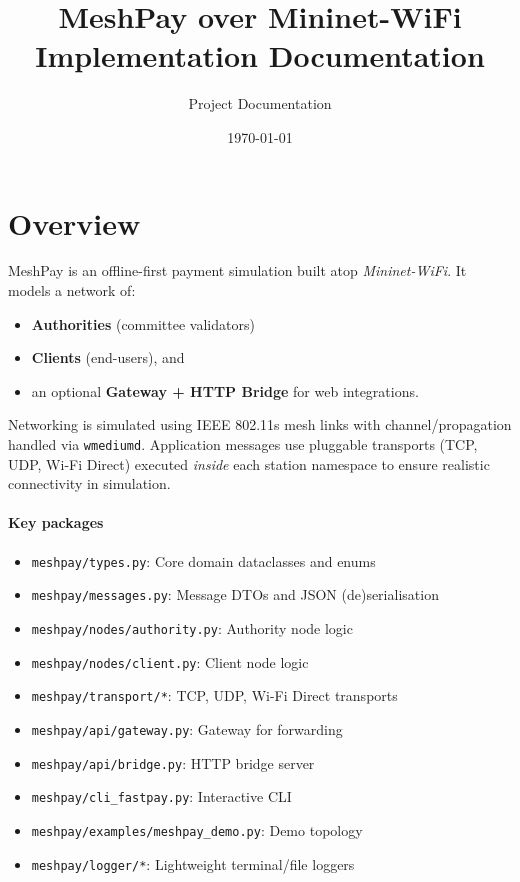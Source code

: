 \documentclass[11pt,a4paper]{article}
\title{MeshPay over Mininet-WiFi\\Implementation Documentation}
\author{Project Documentation}
\date{\today}
\begin{document}
\maketitle
\tableofcontents
\vspace{1em}

\section{Overview}
MeshPay is an offline-first payment simulation built atop \emph{Mininet-WiFi}. It models a network of:\\
\begin{itemize}[noitemsep]
  \item \textbf{Authorities} (committee validators)\,
  \item \textbf{Clients} (end-users), and
  \item an optional \textbf{Gateway + HTTP Bridge} for web integrations.
\end{itemize}

Networking is simulated using IEEE 802.11s mesh links with channel/propagation handled via \texttt{wmediumd}. Application messages use pluggable transports (TCP, UDP, Wi-Fi Direct) executed \emph{inside} each station namespace to ensure realistic connectivity in simulation.

\paragraph{Key packages}
\begin{itemize}[noitemsep]
  \item \texttt{meshpay/types.py}: Core domain dataclasses and enums
  \item \texttt{meshpay/messages.py}: Message DTOs and JSON (de)serialisation
  \item \texttt{meshpay/nodes/authority.py}: Authority node logic
  \item \texttt{meshpay/nodes/client.py}: Client node logic
  \item \texttt{meshpay/transport/*}: TCP, UDP, Wi-Fi Direct transports
  \item \texttt{meshpay/api/gateway.py}: Gateway for forwarding
  \item \texttt{meshpay/api/bridge.py}: HTTP bridge server
  \item \texttt{meshpay/cli_fastpay.py}: Interactive CLI
  \item \texttt{meshpay/examples/meshpay_demo.py}: Demo topology
  \item \texttt{meshpay/logger/*}: Lightweight terminal/file loggers
\end{itemize}
\end{document}
